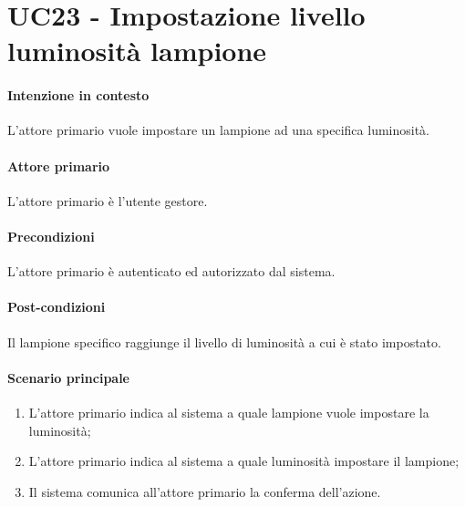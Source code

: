 \section{UC23 - Impostazione livello luminosità lampione}\label{uc:23}
\paragraph{Intenzione in contesto} L'attore primario vuole impostare un lampione ad una specifica luminosità.

\paragraph{Attore primario} L'attore primario è l'utente gestore.

\paragraph{Precondizioni} L'attore primario è autenticato ed autorizzato dal sistema.

\paragraph{Post-condizioni} Il lampione specifico raggiunge il livello di luminosità a cui è stato impostato.
\paragraph{Scenario principale}
\begin{enumerate}
    \item L'attore primario indica al sistema a quale lampione vuole impostare la luminosità;
    \item L'attore primario indica al sistema a quale luminosità impostare il lampione;
    \item Il sistema comunica all'attore primario la conferma dell'azione.
\end{enumerate}
